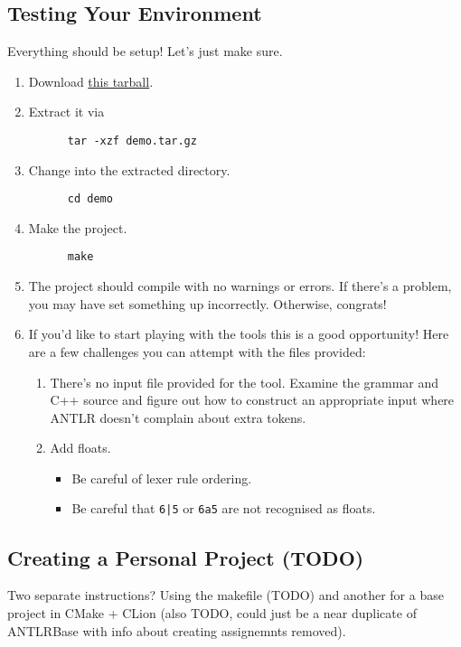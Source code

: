 \documentclass[../setup.tex]{subfiles}
\begin{document}
\subsection{Testing Your Environment}
Everything should be setup! Let's just make sure.
\begin{enumerate}
  \item
    Download \href{https://webdocs.cs.ualberta.ca/\%7Ec415/setup/static/demo.tar.gz} {this
    tarball}.
  \item
    Extract it via
    \begin{lstlisting}
      tar -xzf demo.tar.gz
    \end{lstlisting}
  \item
    Change into the extracted directory.
    \begin{lstlisting}
      cd demo
    \end{lstlisting}
  \item
    Make the project.
    \begin{lstlisting}
      make
    \end{lstlisting}
  \item
    The project should compile with no warnings or errors. If there's a problem, you may have set
    something up incorrectly. Otherwise, congrats!
  \item
    If you'd like to start playing with the tools this is a good opportunity! Here are a few
    challenges you can attempt with the files provided:
    \begin{enumerate}
      \item
        There's no input file provided for the tool. Examine the grammar and C++ source and
        figure out how to construct an appropriate input where ANTLR doesn't complain about extra
        tokens.
      \item
        Add floats.
        \begin{itemize}
          \item Be careful of lexer rule ordering.
          \item Be careful that \lstinline{6|5} or \lstinline{6a5} are not recognised as floats.
        \end{itemize}
    \end{enumerate}
\end{enumerate}

\subsection{Creating a Personal Project (TODO)}
Two separate instructions? Using the makefile (TODO) and another for a base project in CMake +
CLion (also TODO, could just be a near duplicate of ANTLRBase with info about creating assignemnts
removed).
\end{document}
